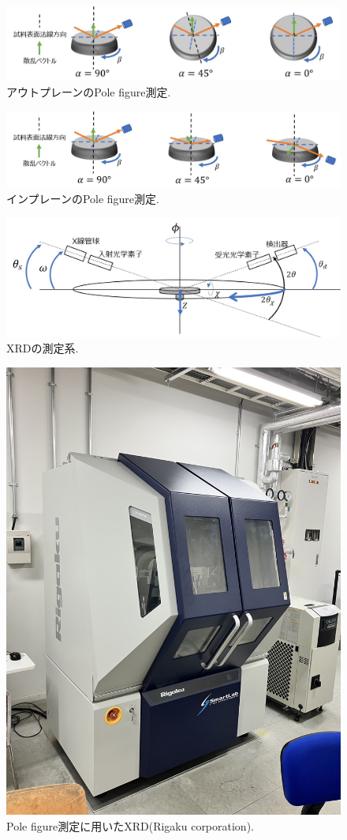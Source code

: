 \documentclass[dvipdfmx,12pt,a4paper]{jreport}
\begin{document}
			\begin{figure}[h]
				\centering
				\includegraphics[width=0.9\linewidth]{pole_figure_outplane.jpg}
				\caption{アウトプレーンのPole figure測定.}
				\label{Pole_figure_outplane}
			\end{figure}
			\begin{figure}[h]
				\centering
				\includegraphics[width=0.9\linewidth]{pole_figure_inplane.jpg}
				\caption{インプレーンのPole figure測定.}
				\label{Pole_figure_inplane}
			\end{figure}
			\begin{figure}[h]
				\centering
				\includegraphics[width=0.9\linewidth]{XRD_配置.jpg}
				\caption{XRDの測定系.}
				\label{XRD_配置}
			\end{figure}
			\newpage
			\begin{figure}[h]
				\centering
				\includegraphics[width=0.5\linewidth]{smartlab.jpg}
				\caption{Pole figure測定に用いたXRD(Rigaku corporation).}
				\label{XRD_pole_figure}
			\end{figure}
			\newpage
\end{document}
